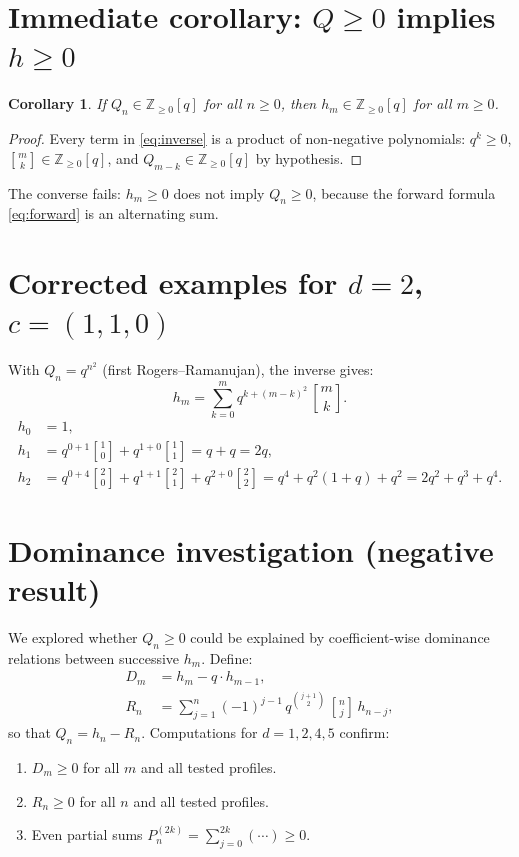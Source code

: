 \documentclass[11pt]{article}
\newtheorem{corollary}[theorem]{Corollary}
\newcommand{\Z}{\mathbb{Z}}
\newcommand{\qbin}[2]{\genfrac{[}{]}{0pt}{}{#1}{#2}}
\begin{document}
\section{Immediate corollary: $Q \geq 0$ implies $h \geq 0$}

\begin{corollary}
If $Q_n \in \Z_{\geq 0}[q]$ for all $n \geq 0$, then
$h_m \in \Z_{\geq 0}[q]$ for all $m \geq 0$.
\end{corollary}

\begin{proof}
Every term in \eqref{eq:inverse} is a product of non-negative
polynomials: $q^k \geq 0$, $\qbin{m}{k} \in \Z_{\geq 0}[q]$,
and $Q_{m-k} \in \Z_{\geq 0}[q]$ by hypothesis.
\end{proof}

The converse fails: $h_m \geq 0$ does not imply $Q_n \geq 0$,
because the forward formula \eqref{eq:forward} is an alternating sum.

\section{Corrected examples for $d = 2$, $c = (1,1,0)$}

With $Q_n = q^{n^2}$ (first Rogers--Ramanujan), the inverse gives:
\[
  h_m = \sum_{k=0}^{m} q^{k + (m-k)^2}\, \qbin{m}{k}.
\]
\begin{align*}
  h_0 &= 1, \\
  h_1 &= q^{0+1}\qbin{1}{0} + q^{1+0}\qbin{1}{1} = q + q = 2q, \\
  h_2 &= q^{0+4}\qbin{2}{0} + q^{1+1}\qbin{2}{1} + q^{2+0}\qbin{2}{2}
       = q^4 + q^2(1+q) + q^2 = 2q^2 + q^3 + q^4.
\end{align*}

\section{Dominance investigation (negative result)}

We explored whether $Q_n \geq 0$ could be explained by
coefficient-wise dominance relations between successive $h_m$.
Define:
\begin{align*}
  D_m &= h_m - q \cdot h_{m-1}, \\
  R_n &= \sum_{j=1}^{n} (-1)^{j-1}\, q^{\binom{j+1}{2}}\,
    \qbin{n}{j}\, h_{n-j},
\end{align*}
so that $Q_n = h_n - R_n$.  Computations for
$d = 1, 2, 4, 5$ confirm:
\begin{enumerate}
  \item $D_m \geq 0$ for all $m$ and all tested profiles.
  \item $R_n \geq 0$ for all $n$ and all tested profiles.
  \item Even partial sums $P_n^{(2k)} = \sum_{j=0}^{2k}(\cdots) \geq 0$.
\end{enumerate}
\end{document}
